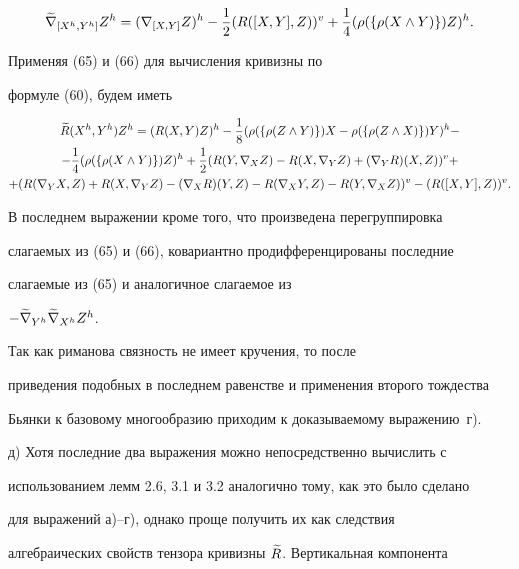 \begin{pf}
\begin{equation}


\grn{[\gh{X},\gh{Y}]}{\gh{Z}}=


\gh{(\n{[X,Y]}{Z})}-\1\gv{(R([X,Y],Z))}+\4\gh{(\rho(\{\rho


(X\land Y)\})Z)}.


\end{equation}


Применяя (65) и (66) для вычисления кривизны по


формуле (60), будем иметь


\begin{multline*}


\g{R}(\gh{X},\gh{Y})\gh{Z}=\gh{(R(X,Y)Z)}-\8\gh{(\rho(\{\rho


(Z\land Y)\})X-\rho(\{\rho(Z\land X)\})Y)}-\\


-\4\gh{(\rho(\{\rho(X\land Y)\})Z)}+\1\gv{(R(Y,\n{X}{Z})-R(X,


\n{Y}{Z})+(\n{Y}{R})(X,Z))}+\\


+\gv{(R(\n{Y}{X},Z)+R(X,\n{Y}{Z})-(\n{X}{R})(Y,Z)-R(\n{X}{Y},Z)-R(Y,


\n{X}{Z}))}-\gv{(R([X,Y],Z))}.


\end{multline*}


В последнем выражении кроме того, что произведена перегруппировка


слагаемых из (65) и (66), ковариантно продифференцированы последние


слагаемые из (65) и аналогичное слагаемое из


$-\widetilde\nabla_{{Y}{}^h}{\widetilde\nabla_{{X}{}^h}{{Z}{}^h}}$.


Так как риманова связность не имеет кручения, то после


приведения подобных в последнем равенстве и применения второго тождества


Бьянки к базовому многообразию приходим к доказываемому выражению~г).





д) Хотя последние два выражения можно непосредственно вычислить с


использованием лемм 2.6, 3.1 и 3.2 аналогично тому, как это было сделано


для выражений а)--г), однако проще получить их как следствия


алгебраических свойств тензора кривизны $\widetilde {R}$. Вертикальная компонента



\end{pf}
